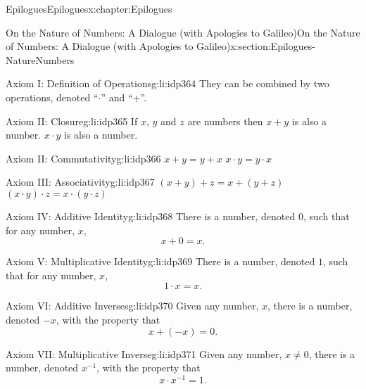 \begin{chapterptx}{Epilogues}{}{Epilogues}{}{}{x:chapter:Epilogues}
\begin{sectionptx}{On the Nature of Numbers: A Dialogue (with Apologies to Galileo)}{}{On the Nature of Numbers: A Dialogue (with Apologies to Galileo)}{}{}{x:section:Epilogues-NatureNumbers}
\begin{introduction}{}
			\begin{descriptionlist}
				\begin{dlimedium}{Axiom I: Definition of Operations}{g:li:idp364}%
					They can be combined by two operations, denoted ``\(\cdot\)'' and ``+''.%
				\end{dlimedium}%
				\begin{dlimedium}{Axiom II: Closure}{g:li:idp365}%
					If \(x\), \(y\) and \(z\) are numbers then \(x+y\) is also a number. \(x\cdot y\) is also a number.%
				\end{dlimedium}%
				\begin{dlimedium}{Axiom II: Commutativity}{g:li:idp366}%
					\(x+y=y+x\) \(x\cdot y=y\cdot x\)%
				\end{dlimedium}%
				\begin{dlimedium}{Axiom III: Associativity}{g:li:idp367}%
					\((x+y)+z=x+(y+z)\) \((x\cdot y)\cdot z = x\cdot(y\cdot z)\)%
				\end{dlimedium}%
				\begin{dlimedium}{Axiom IV: Additive Identity}{g:li:idp368}%
					There is a number, denoted \(0\), such that for any number, \(x\),%
					\begin{equation*}
						x+0=x\text{.}
					\end{equation*}
				\end{dlimedium}%
				\begin{dlimedium}{Axiom V: Multiplicative Identity}{g:li:idp369}%
					There is a number, denoted \(1\), such that for any number, \(x\),%
					\begin{equation*}
						1\cdot x=x\text{.}
					\end{equation*}
				\end{dlimedium}%
				\begin{dlimedium}{Axiom VI: Additive Inverses}{g:li:idp370}%
					Given any number, \(x\), there is a number, denoted \(-x\), with the property that%
					\begin{equation*}
						x+(-x)=0\text{.}
					\end{equation*}
				\end{dlimedium}%
				\begin{dlimedium}{Axiom VII: Multiplicative Inverse}{g:li:idp371}%
					Given any number, \(x\ne0\), there is a number, denoted \(x^{-1}\), with the property that%
					\begin{equation*}
						x\cdot x^{-1} =1\text{.}
					\end{equation*}
				\end{dlimedium}%

\end{descriptionlist}
\end{introduction}
\end{sectionptx}
\end{chapterptx}
